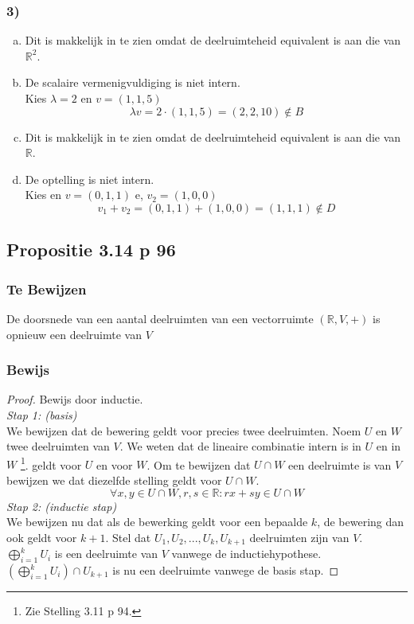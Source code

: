 \documentclass[lineaire_algebra_oplossingen.tex]{subfiles}
\begin{document}
\subsubsection*{3)}
\begin{enumerate}[(a)]
\item
Dit is makkelijk in te zien omdat de deelruimteheid equivalent is aan die van $\mathbb{R}^2$.

\item
De scalaire vermenigvuldiging is niet intern.\\
Kies $\lambda = 2$ en $v=(1,1,5)$
\[
\lambda v = 2 \cdot (1,1,5) = (2,2,10) \not \in B
\]

\item
Dit is makkelijk in te zien omdat de deelruimteheid equivalent is aan die van $\mathbb{R}$.

\item
De optelling is niet intern.\\
Kies en $v=(0,1,1)$ e, $v_2 = (1,0,0)$
\[
v_1 + v_2 = (0,1,1) + (1,0,0) = (1,1,1) \not \in D
\]
\end{enumerate}


\subsection{Propositie 3.14 p 96}
\label{3.14}
\subsubsection*{Te Bewijzen}
De doorsnede van een aantal deelruimten van een vectorruimte $(\mathbb{R},V,+)$ is opnieuw een deelruimte van $V$

\subsubsection*{Bewijs}
\begin{proof}
Bewijs door inductie.\\
\emph{Stap 1: (basis)}\\
We bewijzen dat de bewering geldt voor precies twee deelruimten.
Noem $U$ en $W$ twee deelruimten van $V$. We weten dat de lineaire combinatie intern is in $U$ en in $W$ \footnote{Zie Stelling 3.11 p 94.}. geldt voor $U$ en voor $W$. Om te bewijzen dat $U\cap W$ een deelruimte is van $V$ bewijzen we dat diezelfde stelling geldt voor $U\cap W$.
\[
\forall x,y\in U\cap W, r,s\in \mathbb{R}: rx+sy\in U\cap W
\]
\emph{Stap 2: (inductie stap)}\\
We bewijzen nu dat als de bewerking geldt voor een bepaalde $k$, de bewering dan ook geldt voor $k+1$.
Stel dat $U_1,U_2,...,U_k,U_{k+1}$ deelruimten zijn van $V$. $\bigoplus_{i=1}^k U_i$ is een deelruimte van $V$ vanwege de inductiehypothese. $(\bigoplus_{i=1}^k U_i) \cap U_{k+1}$ is nu een deelruimte vanwege de basis stap.
\end{proof}
\end{document}
